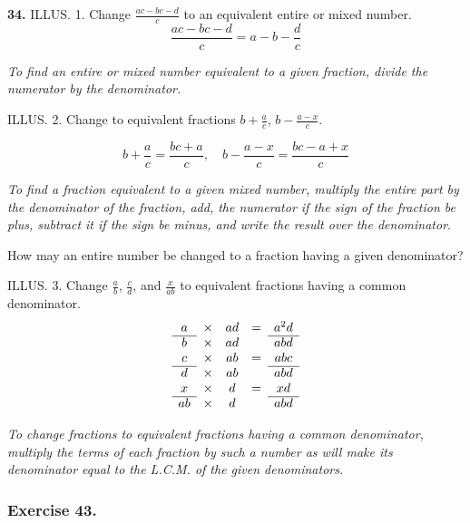 \documentclass{book}
\begin{document}
\textbf{34.} ILLUS. 1. Change $\frac{ac-bc-d}{c}$ to an equivalent
entire or mixed number.
\[
 \frac{ac-bc-d}{c} = a - b -\frac{d}{c}
\]

\textit{To find an entire or mixed number equivalent to
a given fraction, divide the numerator by the denominator.}


ILLUS. 2. Change to equivalent fractions $b + \frac{a}{c}$, $b - \frac{a - x}{c}$.

\[
b + \frac{a}{c} = \frac{bc + a}{c},\quad b - \frac{a - x}{c} =
\frac{bc - a + x}{c}
\]

\textit{ To find a fraction equivalent to a given mixed number,
multiply the entire part by the denominator of the fraction, add,
the numerator if the sign of the fraction be plus, subtract it if
the sign be minus, and write the result over the denominator}.

How may an entire number be changed to a fraction having a given denominator?

ILLUS. 3. Change $\frac{a}{b}$, $\frac{c}{d}$, and $\frac{x}{ab}$ to equivalent fractions having a common denominator.
\[
\begin{array}{ccccc}
a & \times & ad & = &a^2d\\
\cline{1-1}  \cline{5-5}
b & \times & ad &  &abd\\

c & \times & ab & = &abc\\
\cline{1-1}  \cline{5-5}
d & \times & ab &  &abd\\

x & \times & d & = &xd\\
\cline{1-1}  \cline{5-5}
ab & \times & d &  &abd\\
\end{array}
\]

\textit{ To change fractions to equivalent fractions having a
common denominator, multiply the terms of each fraction by such a
number as will make its denominator equal to the L.C.M. of the
given denominators.}

\subsubsection*{Exercise 43.}
\end{document}
